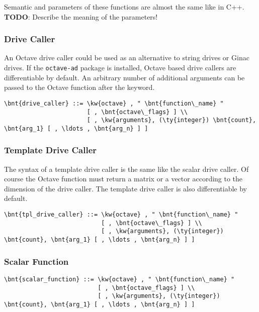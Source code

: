 Semantic and parameters of these functions are almost the same like in C++. \\
\textbf{TODO}: Describe the meaning of the parameters!

\subsubsection{Drive Caller}
An Octave drive caller could be used as an alternative to string drives or Ginac drives. 
If the \texttt{octave-ad} package is installed, Octave based drive callers are differentiable by default.
An arbitrary number of additional arguments can be passed to the Octave function  after the  keyword.
\begin{Verbatim}[commandchars=\\\{\}]
    \bnt{drive_caller} ::= \kw{octave} , " \bnt{function\_name} "
                       [ , \bnt{octave\_flags} ] \\
                       [ , \kw{arguments}, (\ty{integer}) \bnt{count}, \bnt{arg_1} [ , \ldots , \bnt{arg_n} ] ]
\end{Verbatim}

\subsubsection{Template Drive Caller}
The syntax of a template drive caller is the same like the scalar drive caller. Of course the Octave function must return a matrix or a vector according to the dimension of the drive caller. The template drive caller is also differentiable by default.
\begin{Verbatim}[commandchars=\\\{\}]
    \bnt{tpl_drive_caller} ::= \kw{octave} , " \bnt{function\_name} "
                           [ , \bnt{octave\_flags} ] \\
                           [ , \kw{arguments}, (\ty{integer}) \bnt{count}, \bnt{arg_1} [ , \ldots , \bnt{arg_n} ] ]
\end{Verbatim}

\subsubsection{Scalar Function}
\begin{Verbatim}[commandchars=\\\{\}]
    \bnt{scalar_function} ::= \kw{octave} , " \bnt{function\_name} "
                          [ , \bnt{octave_flags} ] \\
                          [ , \kw{arguments}, (\ty{integer}) \bnt{count}, \bnt{arg_1} [ , \ldots , \bnt{arg_n} ] ]
\end{Verbatim}


